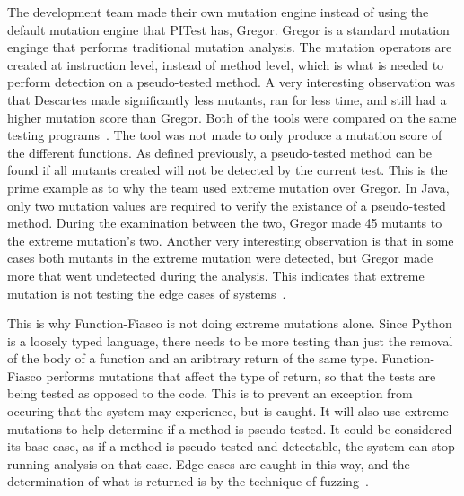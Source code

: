 The development team made their own mutation engine instead of using the default mutation engine that PITest has, Gregor. Gregor is a standard mutation enginge that performs traditional mutation analysis. The mutation operators are created at instruction level, instead of method level, which is what is needed to perform detection on a pseudo-tested method. A very interesting observation was that Descartes made significantly less mutants, ran for less time, and still had a higher mutation score than Gregor. Both of the tools were compared on the same testing programs~\cite{niedermayr2016will}.
The tool was not made to only produce a mutation score of the different functions. As defined previously, a pseudo-tested method can be found if all mutants created will not be detected by the current test. This is the prime example as to why the team used extreme mutation over Gregor. In Java, only two mutation values are required to verify the existance of a pseudo-tested method. During the examination between the two, Gregor made 45 mutants to the extreme mutation's two. Another very interesting observation is that in some cases both mutants in the extreme mutation were detected, but Gregor made more that went undetected during the analysis. This indicates that extreme mutation is not testing the edge cases of systems~\cite{niedermayr2016will}.

This is why Function-Fiasco is not doing extreme mutations alone. Since Python is a loosely typed language, there needs to be more testing than just the removal of the body of a function and an aribtrary return of the same type. Function-Fiasco performs mutations that affect the type of return, so that the tests are being tested as opposed to the code. This is to prevent an exception from occuring that the system may experience, but is caught. It will also use extreme mutations to help determine if a method is pseudo tested. It could be considered its base case, as if a method is pseudo-tested and detectable, the system can stop running analysis on that case. Edge cases are caught in this way, and the determination of what is returned is by the technique of fuzzing~\cite{niedermayr2016will}.

